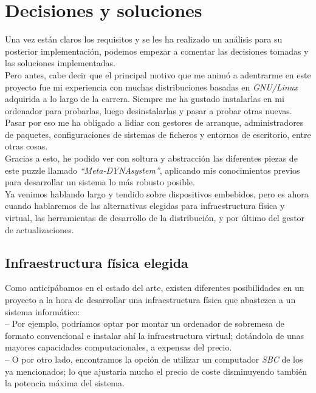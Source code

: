 \chapter{Decisiones y soluciones}

Una vez están claros los requisitos y se les ha realizado un análisis para su posterior implementación, podemos empezar a comentar las decisiones tomadas y las soluciones implementadas.\\

Pero antes, cabe decir que el principal motivo que me animó a adentrarme en este proyecto fue mi experiencia con muchas distribuciones basadas en \textit{GNU/Linux} adquirida a lo largo de la carrera. Siempre me ha gustado instalarlas en mi ordenador para probarlas, luego desinstalarlas y pasar a probar otras nuevas. Pasar por eso me ha obligado a lidiar con gestores de arranque, administradores de paquetes, configuraciones de sistemas de ficheros y entornos de escritorio, entre otras cosas.\\

Gracias a esto, he podido ver con soltura y abstracción las diferentes piezas de este puzzle llamado \textit{``Meta-DYNAsystem''}, aplicando mis conocimientos previos para desarrollar un sistema lo más robusto posible.\\

Ya venimos hablando largo y tendido sobre dispositivos embebidos, pero es ahora cuando hablaremos de las alternativas elegidas para infraestructura física y virtual, las herramientas de desarrollo de la distribución, y por último del gestor de actualizaciones.

\section{Infraestructura física elegida}

Como anticipábamos en el estado del arte, existen diferentes posibilidades en un proyecto a la hora de desarrollar una infraestructura física que abastezca a un sistema informático:\\

-- Por ejemplo, podríamos optar por montar un ordenador de sobremesa de formato convencional e instalar ahí la infraestructura virtual; dotándola de unas mayores capacidades computacionales, a expensas del precio.\\

-- O por otro lado, encontramos la opción de utilizar un computador \textit{SBC} de los ya mencionados; lo que ajustaría mucho el precio de coste disminuyendo también la potencia máxima del sistema.\\

